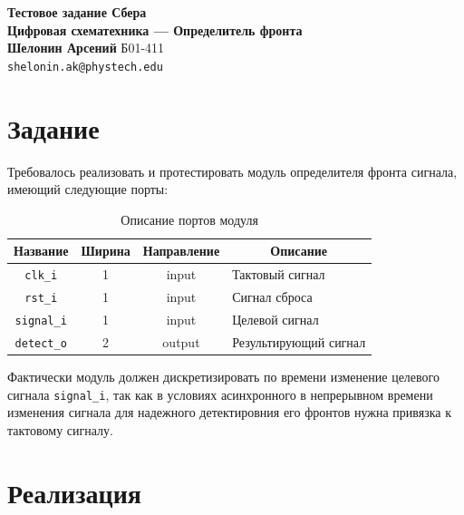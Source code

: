 

\graphicspath{{img/}}



\begin{center}
    {\Large \textbf{Тестовое задание Сбера \\ Цифровая схематехника --- Определитель фронта}} \\[0.3cm]
    
    \textbf{Шелонин Арсений} Б01-411 \\
    \texttt{shelonin.ak@phystech.edu}
\end{center}

\tableofcontents
\newpage

\section{Задание}
Требовалось реализовать и протестировать модуль определителя фронта сигнала, имеющий следующие порты:

\begin{table}[h]
    \centering
    \begin{tabular}{|c|c|c|l|}
        \hline
        \textbf{Название} & \textbf{Ширина} & \textbf{Направление} & \multicolumn{1}{c|}{\textbf{Описание}} \\
        \hline
        \texttt{clk\_i} & 1 & input & Тактовый сигнал \\
        \hline
        \texttt{rst\_i} & 1 & input & Сигнал сброса \\
        \hline
        \texttt{signal\_i} & 1 & input & Целевой сигнал \\
        \hline
        \texttt{detect\_o} & 2 & output & Результирующий сигнал \\
        \hline
    \end{tabular}
    \caption{Описание портов модуля}
    \label{tab:module_ports}
\end{table}

Фактически модуль должен дискретизировать по времени изменение целевого сигнала \texttt{signal\_i}, так как в условиях асинхронного в непрерывном времени изменения сигнала для надежного детектировния его фронтов нужна привязка к тактовому сигналу.

\newpage

\section{Реализация}

